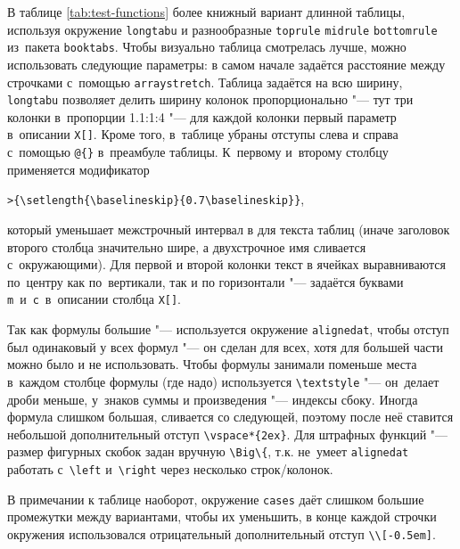 В таблице \cref{tab:test-functions} более книжный вариант
длинной таблицы, используя окружение \verb!longtabu! и разнообразные
\verb!toprule! \verb!midrule! \verb!bottomrule! из~пакета
\verb!booktabs!. Чтобы визуально таблица смотрелась лучше, можно
использовать следующие параметры: в самом начале задаётся расстояние
между строчками с~помощью \verb!arraystretch!. Таблица задаётся на
всю ширину, \verb!longtabu! позволяет делить ширину колонок
пропорционально "--- тут три колонки в~пропорции 1.1:1:4 "--- для каждой
колонки первый параметр в~описании \verb!X[]!. Кроме того, в~таблице
убраны отступы слева и справа с~помощью \verb!@{}!
в~преамбуле таблицы. К~первому и~второму столбцу применяется
модификатор

\verb!>{\setlength{\baselineskip}{0.7\baselineskip}}!,

\noindent который уменьшает межстрочный интервал в для текста таблиц (иначе
заголовок второго столбца значительно шире, а двухстрочное имя
сливается с~окружающими). Для первой и второй колонки текст в ячейках
выравниваются по~центру как по~вертикали, так и по горизонтали "---
задаётся буквами \verb!m!~и~\verb!c!~в~описании столбца \verb!X[]!.

Так как формулы большие "--- используется окружение \verb!alignedat!,
чтобы отступ был одинаковый у всех формул "--- он сделан для всех, хотя
для большей части можно было и не использовать.  Чтобы формулы
занимали поменьше места в~каждом столбце формулы (где надо)
используется \verb!\textstyle! "--- он~делает дроби меньше, у~знаков
суммы и произведения "--- индексы сбоку. Иногда формула слишком большая,
сливается со следующей, поэтому после неё ставится небольшой
дополнительный отступ \verb!\vspace*{2ex}!. Для штрафных функций "---
размер фигурных скобок задан вручную \verb!\Big\{!, т.\:к. не~умеет
\verb!alignedat! работать с~\verb!\left! и~\verb!\right! через
несколько строк/колонок.

В примечании к таблице наоборот, окружение \verb!cases! даёт слишком
большие промежутки между вариантами, чтобы их уменьшить, в конце
каждой строчки окружения использовался отрицательный дополнительный
отступ \verb!\\[-0.5em]!.

